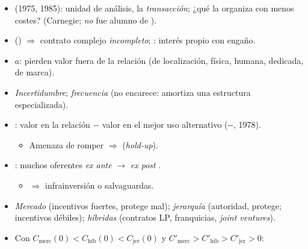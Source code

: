 \documentclass{article}
\begin{document}
\begin{columnas}
\begin{itemize}
\item (1975, 1985): unidad de análisis, la \emph{transacción}; ¿qué  la organiza con menos costes? (Carnegie; \emph{no} fue alumno de ).
\end{itemize}
\begin{itemize}
\item {} () $\Rightarrow$ contrato complejo \emph{incompleto}; : interés propio con engaño.
\end{itemize}
\begin{itemize}
\item {} $a$: pierden valor fuera de la relación (de localización, física, humana, dedicada, de marca).
\item \emph{Incertidumbre}; \emph{frecuencia} (no encarece: amortiza una estructura especializada).
\end{itemize}
\begin{itemize}
\item {}: valor en la relación $-$ valor en el mejor uso alternativo (--, 1978).
  \begin{itemize}
  \item Amenaza de romper $\Rightarrow$  (\emph{hold-up}).
  \end{itemize}
\item {}: muchos oferentes \emph{ex ante} $\to$  \emph{ex post} .
  \begin{itemize}
  \item $\Rightarrow$ infrainversión o salvaguardas.
  \end{itemize}
\end{itemize}
\begin{itemize}
\item \emph{Mercado} (incentivos fuertes, protege mal); \emph{jerarquía} (autoridad, protege; incentivos débiles); \emph{híbridas} (contratos LP, franquicias, \emph{joint ventures}).
\item Con $C_{\text{merc}}(0)<C_{\text{híb}}(0)<C_{\text{jer}}(0)$ y $C'_{\text{merc}}>C'_{\text{híb}}>C'_{\text{jer}}>0$:

\end{itemize}
\end{columnas}
\end{document}
